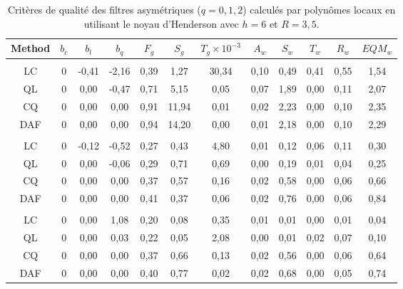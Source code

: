 \documentclass[
  12pt,
  a4paper,french]{article}
\newcommand\1{\mathds{1}}
\begin{document}
\begin{table}[!h]

\caption{\label{tab:criteriaLp}Critères de qualité des filtres asymétriques ($q=0,1,2$) calculés par polynômes locaux en utilisant le noyau d'Henderson avec $h=6$ et $R=3,5$.}
{
\centering
\begin{tabular}[t]{cccccccccccc}
\toprule
Method & $b_c$ & $b_l$ & $b_q$ & $F_g$ & $S_g$ & $T_g \times 10^{-3}$ & $A_w$ & $S_w$ & $T_w$ & $R_w$ & $EQM_w$\\
\midrule
\addlinespace[0.3em]
\multicolumn{12}{l}{\textbf{$q=0$}}\\
\hspace{1em}LC & 0 & -0,41 & -2,16 & 0,39 & 1,27 & 30,34 & 0,10 & 0,49 & 0,41 & 0,55 & 1,54\\
\hspace{1em}QL & 0 & 0,00 & -0,47 & 0,71 & 5,15 & 0,05 & 0,07 & 1,89 & 0,00 & 0,11 & 2,07\\
\hspace{1em}CQ & 0 & 0,00 & 0,00 & 0,91 & 11,94 & 0,01 & 0,02 & 2,23 & 0,00 & 0,10 & 2,35\\
\hspace{1em}DAF & 0 & 0,00 & 0,00 & 0,94 & 14,20 & 0,00 & 0,01 & 2,18 & 0,00 & 0,10 & 2,29\\
\addlinespace[0.3em]
\multicolumn{12}{l}{\textbf{$q=1$}}\\
\hspace{1em}LC & 0 & -0,12 & -0,52 & 0,27 & 0,43 & 4,80 & 0,01 & 0,12 & 0,06 & 0,11 & 0,30\\
\hspace{1em}QL & 0 & 0,00 & -0,06 & 0,29 & 0,71 & 0,69 & 0,00 & 0,19 & 0,01 & 0,04 & 0,25\\
\hspace{1em}CQ & 0 & 0,00 & 0,00 & 0,37 & 0,57 & 0,16 & 0,02 & 0,58 & 0,00 & 0,06 & 0,66\\
\hspace{1em}DAF & 0 & 0,00 & 0,00 & 0,41 & 0,37 & 0,06 & 0,02 & 0,76 & 0,00 & 0,06 & 0,84\\
\addlinespace[0.3em]
\multicolumn{12}{l}{\textbf{$q=2$}}\\
\hspace{1em}LC & 0 & 0,00 & 1,08 & 0,20 & 0,08 & 0,35 & 0,01 & 0,01 & 0,00 & 0,01 & 0,04\\
\hspace{1em}QL & 0 & 0,00 & 0,03 & 0,22 & 0,05 & 2,08 & 0,00 & 0,01 & 0,02 & 0,07 & 0,10\\
\hspace{1em}CQ & 0 & 0,00 & 0,00 & 0,37 & 0,66 & 0,13 & 0,02 & 0,56 & 0,00 & 0,06 & 0,64\\
\hspace{1em}DAF & 0 & 0,00 & 0,00 & 0,40 & 0,77 & 0,02 & 0,02 & 0,68 & 0,00 & 0,05 & 0,74\\
\bottomrule
\end{tabular}
}
\footnotesize



\end{table}
\end{document}
